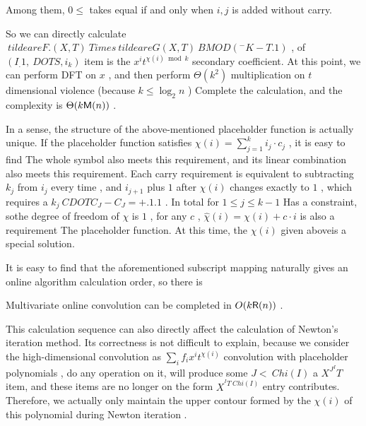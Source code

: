 {\begin { lemma }
Among them, $ 0 \le  $ takes equal if and only when $ i, j $ is added without carry.
\end { lemma }

\begin { proof }
Noted that only $ 0 \ Le  \ left \ lfloor  \ FRAC {{I} of n_1} \ right \ rfloor + \ left \ lfloor  \ FRAC {J} of n_1} { \ right \ rfloor - \ left \ lfloor  \ FRAC {I +j}{n_1} \right \rfloor \le  1 $ , where $ 0 \le  $ is equal and only if the addition of the lowest bit is not carried. In the same way, each term in the summation of $ \chi $ has the same properties.
\end { proof }

So we can directly calculate $ \ tilde are F. (X, T) \ Times  \ tilde are G (X, T) \ BMOD (^ - K-T . 1 ) $ , of $ (I_ . 1 , \ DOTS , i_k) $ item is the $ x^it^{ \chi (i) \bmod k} $ secondary coefficient. At this point, we can perform DFT on $ x $ , and then perform $ \Theta (k^ 2 ) $ multiplication on $ t $ dimensional violence (because $ k \le \log _ 2 n $ ) Complete the calculation, and the complexity is $ \Theta (k  \mathsf M (n)) $ .

In a sense, the structure of the above-mentioned placeholder function is actually unique. If the placeholder function satisfies $ \chi (i) = \sum _{j=1}^k i_j \cdot c_j $ , it is easy to find The whole symbol also meets this requirement, and its linear combination also meets this requirement. Each carry requirement is equivalent to subtracting $ k_j $ from $ i_j $ every time , and $ i_{j+1} $ plus $ 1 $ after $ \chi (i) $ changes exactly to $ 1 $ , which requires a $ k_j \ CDOT C_J - C_ {J} = +. 1 . 1 $ . In total for $ 1 \le j \le k- 1$ Has a constraint, sothe degree of freedom of $ \chi $ is $ 1 $ , for any $ c $ , $ \widehat  \chi (i) = \chi (i) + c \cdot i $ is also a requirement The placeholder function. At this time, the $ \chi (i) $ given aboveis a special solution.

It is easy to find that the aforementioned subscript mapping naturally gives an online algorithm calculation order, so there is

\begin { lemma }
Multivariate online convolution can be completed in $ O(k  \mathsf R (n)) $ .
\end { lemma }

This calculation sequence can also directly affect the calculation of Newton's iteration method. Its correctness is not difficult to explain, because we consider the high-dimensional convolution as $ \sum _i f_i x^it^{ \chi (i)} $ convolution with placeholder polynomials , do any operation on it, will produce some $ J < \ Chi (I) $ a $ X ^ J ^ IT $ item, and these items are no longer on the form $ X ^ {^ IT \ Chi (I)} $ entry contributes. Therefore, we actually only maintain the upper contour formed by the $ \chi (i) $ of this polynomial during Newton iteration .

}
